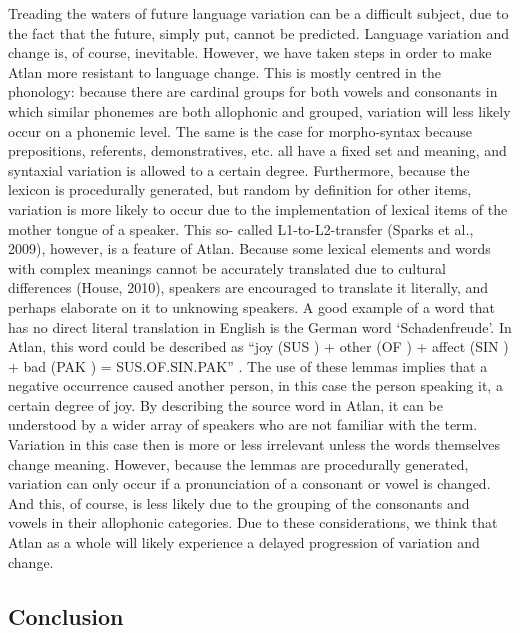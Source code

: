 Treading the waters of future language variation can be a difficult subject, due to the fact that the future, simply put, cannot be predicted. Language variation and change is, of course, inevitable. However, we have taken steps in order to make Atlan more resistant to language change. This is mostly centred in the phonology: because there are cardinal groups for both vowels and consonants in which similar phonemes are both allophonic and grouped, variation will less likely occur on a phonemic level. The same is the case for morpho-syntax because prepositions, referents, demonstratives, etc. all have a fixed set and meaning, and syntaxial variation is allowed to a certain degree. Furthermore, because the lexicon is procedurally generated, but random by definition for other items, variation is more likely to occur due to the implementation of lexical items of the mother tongue of a speaker. This so- called L1-to-L2-transfer (Sparks et al., 2009), however, is a feature of Atlan. Because some lexical elements and words with complex meanings cannot be accurately translated due to cultural differences (House, 2010), speakers are encouraged to translate it literally, and perhaps elaborate on it to unknowing speakers. A good example of a word that has no direct literal translation in English is the German word ‘Schadenfreude’. In Atlan, this word could be described as “joy (SUS \sus) + other (OF \of) + affect (SIN \Atlansin) + bad (PAK \pak) = SUS.OF.SIN.PAK” \sus \of \Atlansin \pak. The use of these lemmas implies that a negative occurrence caused another person, in this case the person speaking it, a certain degree of joy. By describing the source word in Atlan, it can be understood by a wider array of speakers who are not familiar with the term. Variation in this case then is more or less irrelevant unless the words themselves change meaning. However, because the lemmas are procedurally generated, variation can only occur if a pronunciation of a consonant or vowel is changed. And this, of course, is less likely due to the grouping of the consonants and vowels in their allophonic categories. Due to these considerations, we think that Atlan as a whole will likely experience a delayed progression of variation and change.

\subsection{Conclusion}

